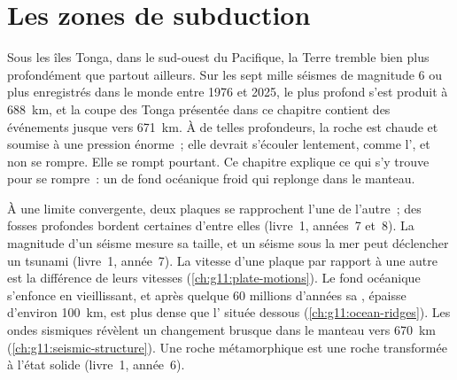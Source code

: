 \chapter{Les zones de subduction}\label{ch:g11:subduction-zones}

Sous les îles Tonga, dans le sud-ouest du Pacifique, la Terre tremble bien
plus profondément que partout ailleurs. Sur les sept mille séismes de
magnitude 6 ou plus enregistrés dans le monde entre 1976 et 2025, le plus
profond s'est produit à \qty{688}{km}, et la coupe des Tonga présentée dans
ce chapitre contient des événements jusque vers \qty{671}{km}. À de telles
profondeurs, la roche est chaude et soumise à une pression énorme~; elle
devrait s'écouler lentement, comme l', et non se rompre. Elle
se rompt pourtant. Ce chapitre explique ce qui s'y trouve pour se rompre~:
un  de fond océanique froid qui replonge dans le manteau.

\begin{recall}
À une limite convergente, deux plaques se rapprochent l'une de l'autre~; des
fosses profondes bordent certaines d'entre elles (livre~1, années~7 et~8).
La magnitude d'un séisme mesure sa taille, et un séisme sous la mer peut
déclencher un tsunami (livre~1, année~7). La vitesse d'une plaque par
rapport à une autre est la différence de leurs vitesses
(\cref{ch:g11:plate-motions}). Le fond océanique s'enfonce en vieillissant,
et après quelque 60 millions d'années sa , épaisse d'environ
\qty{100}{km}, est plus dense que l' située dessous
(\cref{ch:g11:ocean-ridges}). Les ondes sismiques révèlent un changement
brusque dans le manteau vers \qty{670}{km} (\cref{ch:g11:seismic-structure}).
Une roche métamorphique est une roche transformée à l'état solide (livre~1,
année~6).
\end{recall}

